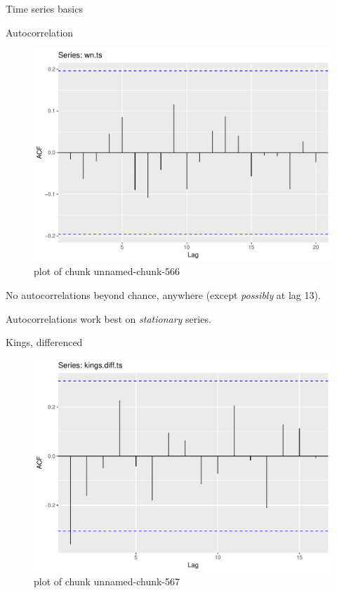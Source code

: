 \documentclass[ignorenonframetext,]{beamer}
\newenvironment{Shaded}{\begin{snugshade}}{\end{snugshade}}
\newcommand{\DataTypeTok}[1]{\textcolor[rgb]{0.13,0.29,0.53}{#1}}
\newcommand{\KeywordTok}[1]{\textcolor[rgb]{0.13,0.29,0.53}{\textbf{#1}}}
\newcommand{\NormalTok}[1]{#1}
\newcommand{\OperatorTok}[1]{\textcolor[rgb]{0.81,0.36,0.00}{\textbf{#1}}}
\newcommand{\StringTok}[1]{\textcolor[rgb]{0.31,0.60,0.02}{#1}}
\begin{document}
\begin{frame}[fragile]{Time series basics}
\begin{block}{Autocorrelation}
\begin{figure}
\centering
\includegraphics{figure/unnamed-chunk-566-1.pdf}
\caption{plot of chunk unnamed-chunk-566}
\end{figure}

No autocorrelations beyond chance, anywhere (except \emph{possibly} at
lag 13).

Autocorrelations work best on \emph{stationary} series.

Kings, differenced

\begin{Shaded}
\end{Shaded}

\begin{figure}
\centering
\includegraphics{figure/unnamed-chunk-567-1.pdf}
\caption{plot of chunk unnamed-chunk-567}
\end{figure}


\end{block}
\end{frame}
\end{document}
